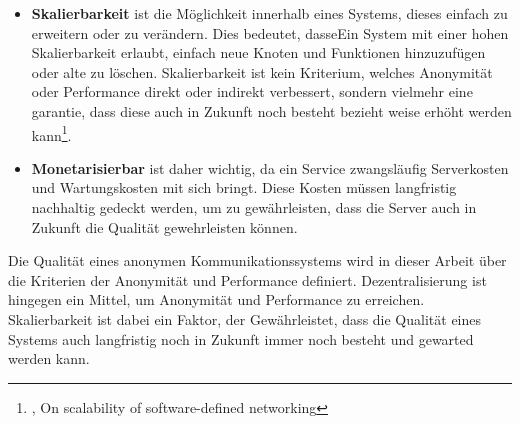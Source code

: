 \begin{itemize}
\item \textbf{Skalierbarkeit} ist die Möglichkeit innerhalb eines Systems, dieses einfach zu erweitern oder zu verändern. Dies bedeutet, dasseEin System mit einer hohen Skalierbarkeit erlaubt, einfach neue Knoten und Funktionen hinzuzufügen oder alte zu löschen. Skalierbarkeit ist kein Kriterium, welches Anonymität oder Performance direkt oder indirekt verbessert, sondern vielmehr eine garantie, dass diese auch in Zukunft noch besteht bezieht weise erhöht werden kann\footnote{\cite{ScalabilityOfNetworking}, On scalability of software-defined networking}.

\item \textbf{Monetarisierbar} ist daher wichtig, da ein Service zwangsläufig Serverkosten und Wartungskosten mit sich bringt. Diese Kosten müssen langfristig nachhaltig gedeckt werden, um zu gewährleisten, dass die Server auch in Zukunft die Qualität gewehrleisten können.

\end{itemize}

Die Qualität eines anonymen Kommunikationssystems wird in dieser Arbeit über die Kriterien der Anonymität und Performance definiert. Dezentralisierung ist hingegen ein Mittel, um Anonymität und Performance zu erreichen. Skalierbarkeit ist dabei ein Faktor, der Gewährleistet, dass die Qualität eines Systems auch langfristig noch in Zukunft immer noch besteht und gewarted werden kann.